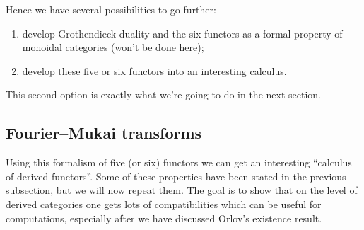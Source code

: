 Hence we have several possibilities to go further:
\begin{enumerate}
  \item develop Grothendieck duality and the six functors as a formal property of monoidal categories (won't be done here);
  \item develop these five or six functors into an interesting calculus.
\end{enumerate}
This second option is exactly what we're going to do in the next section.

\subsection{Fourier--Mukai transforms}
Using this formalism of five (or six) functors we can get an interesting ``calculus of derived functors''. Some of these properties have been stated in the previous subsection, but we will now repeat them. The goal is to show that on the level of derived categories one gets lots of compatibilities which can be useful for computations, especially after we have discussed Orlov's existence result.

